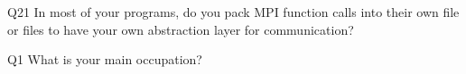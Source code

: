 \begin{description}%
\item{Q21} In most of your programs, do you pack MPI function calls into their own file or files to have your own abstraction layer for communication?%
\item{Q1} What is your main occupation?%
\end{description}%
